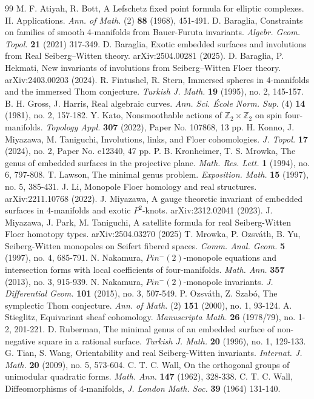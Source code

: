 \documentclass{amsart}
\theoremstyle{definition}
\theoremstyle{remark}
\numberwithin{equation}{section}
\begin{document}


\begin{thebibliography}{99}
M. F. Atiyah, R. Bott, A Lefschetz fixed point formula for elliptic complexes. II. Applications. {\em Ann. of Math.} (2) {\bf 88} (1968), 451-491. 
D. Baraglia, Constraints on families of smooth 4-manifolds from Bauer-Furuta invariants. {\em Algebr. Geom. Topol.} {\bf 21} (2021) 317-349.
D. Baraglia, Exotic embedded surfaces and involutions from Real Seiberg--Witten theory. arXiv:2504.00281 (2025).
D. Baraglia, P. Hekmati, New invariants of involutions from Seiberg--Witten Floer theory. arXiv:2403.00203 (2024).
R. Fintushel, R. Stern, Immersed spheres in $4$-manifolds and the immersed Thom conjecture. {\em Turkish J. Math.} {\bf 19} (1995), no. 2, 145-157.
B. H. Gross, J. Harris, Real algebraic curves. {\em Ann. Sci. \'Ecole Norm. Sup.} (4) {\bf 14} (1981), no. 2, 157-182. 
Y. Kato, Nonsmoothable actions of $\mathbb{Z}_2 \times \mathbb{Z}_2$ on spin four-manifolds. {\em Topology Appl.} {\bf 307} (2022), Paper No. 107868, 13 pp.
H. Konno, J. Miyazawa, M. Taniguchi, Involutions, links, and Floer cohomologies. {\em J. Topol.} {\bf 17} (2024), no. 2, Paper No. e12340, 47 pp.
P. B. Kronheimer, T. S. Mrowka, The genus of embedded surfaces in the projective plane. {\em Math. Res. Lett.} {\bf 1} (1994), no. 6, 797-808.
T. Lawson, The minimal genus problem. {\em Exposition. Math.} {\bf 15} (1997), no. 5, 385-431.
J. Li, Monopole Floer homology and real structures. arXiv:2211.10768 (2022).
J. Miyazawa, A gauge theoretic invariant of embedded surfaces in 4-manifolds and exotic $P^2$-knots. arXiv:2312.02041 (2023).
J. Miyazawa, J. Park, M. Taniguchi, A satellite formula for real Seiberg-Witten Floer homotopy types. arXiv:2504.03270 (2025)
T. Mrowka, P. Ozsv\'ath, B. Yu, Seiberg-Witten monopoles on Seifert fibered spaces. {\em Comm. Anal. Geom.} {\bf 5} (1997), no. 4, 685-791. 
N. Nakamura, $Pin^-(2)$-monopole equations and intersection forms with local coefficients of four-manifolds. {\em Math. Ann.} {\bf 357} (2013), no. 3, 915-939.
N. Nakamura, $Pin^-(2)$-monopole invariants. {\em J. Differential Geom.} {\bf 101} (2015), no. 3, 507-549. 
P. Ozsv\'ath, Z. Szab\'o, The symplectic Thom conjecture. {\em Ann. of Math.} (2) {\bf 151} (2000), no. 1, 93-124. 
A. Stieglitz, Equivariant sheaf cohomology. {\em Manuscripta Math.} {\bf 26} (1978/79), no. 1-2, 201-221.
D. Ruberman, The minimal genus of an embedded surface of non-negative square in a rational surface. {\em Turkish J. Math.} {\bf 20} (1996), no. 1, 129-133.
G. Tian, S. Wang, Orientability and real Seiberg-Witten invariants. {\em Internat. J. Math.} {\bf 20} (2009), no. 5, 573-604. 
C. T. C. Wall, On the orthogonal groups of unimodular quadratic forms. {\em Math. Ann.} {\bf 147} (1962), 328-338. 
C. T. C. Wall, Diffeomorphisms of $4$-manifolds, {\em J. London Math. Soc.} {\bf 39} (1964) 131-140.
\end{thebibliography}
\end{document}
